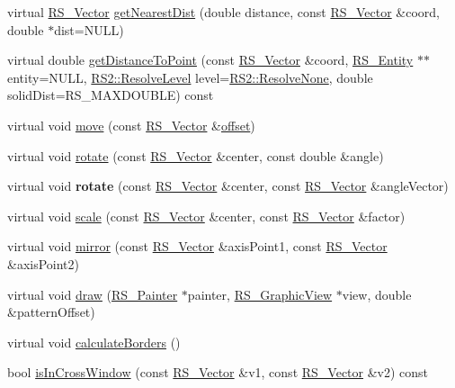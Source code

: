 \begin{DoxyCompactItemize}
\item 
virtual \hyperlink{classRS__Vector}{R\-S\-\_\-\-Vector} \hyperlink{classRS__Solid_adbb51a885514e11fddcdb5795182747e}{get\-Nearest\-Dist} (double distance, const \hyperlink{classRS__Vector}{R\-S\-\_\-\-Vector} \&coord, double $\ast$dist=N\-U\-L\-L)
\item 
virtual double \hyperlink{classRS__Solid_ae2daf279e99bc7f85219e7e456929b9e}{get\-Distance\-To\-Point} (const \hyperlink{classRS__Vector}{R\-S\-\_\-\-Vector} \&coord, \hyperlink{classRS__Entity}{R\-S\-\_\-\-Entity} $\ast$$\ast$entity=N\-U\-L\-L, \hyperlink{classRS2_a1b2c5e3a3e9d1b03a9564229255faa20}{R\-S2\-::\-Resolve\-Level} level=\hyperlink{classRS2_a1b2c5e3a3e9d1b03a9564229255faa20aecb7396f39bc313ad8903c8a5fac5a50}{R\-S2\-::\-Resolve\-None}, double solid\-Dist=R\-S\-\_\-\-M\-A\-X\-D\-O\-U\-B\-L\-E) const 
\item 
virtual void \hyperlink{classRS__Solid_aed6101447eeabe32778563f9ca139a87}{move} (const \hyperlink{classRS__Vector}{R\-S\-\_\-\-Vector} \&\hyperlink{classRS__AtomicEntity_ab708a0d05c11fd7eff646243db60464a}{offset})
\item 
virtual void \hyperlink{classRS__Solid_a4ae083e69808b08ee754c532dff5fa0c}{rotate} (const \hyperlink{classRS__Vector}{R\-S\-\_\-\-Vector} \&center, const double \&angle)
\item 
\hypertarget{classRS__Solid_a706de6d5fb59bc0378154744db448327}{virtual void {\bfseries rotate} (const \hyperlink{classRS__Vector}{R\-S\-\_\-\-Vector} \&center, const \hyperlink{classRS__Vector}{R\-S\-\_\-\-Vector} \&angle\-Vector)}\label{classRS__Solid_a706de6d5fb59bc0378154744db448327}

\item 
virtual void \hyperlink{classRS__Solid_a40a09d59698418b68ea658024053d1ba}{scale} (const \hyperlink{classRS__Vector}{R\-S\-\_\-\-Vector} \&center, const \hyperlink{classRS__Vector}{R\-S\-\_\-\-Vector} \&factor)
\item 
virtual void \hyperlink{classRS__Solid_a589cfb94b97678b58727efabcd6ae7fc}{mirror} (const \hyperlink{classRS__Vector}{R\-S\-\_\-\-Vector} \&axis\-Point1, const \hyperlink{classRS__Vector}{R\-S\-\_\-\-Vector} \&axis\-Point2)
\item 
virtual void \hyperlink{classRS__Solid_a1817d22b8d2d3ebf1178e555ad6381f9}{draw} (\hyperlink{classRS__Painter}{R\-S\-\_\-\-Painter} $\ast$painter, \hyperlink{classRS__GraphicView}{R\-S\-\_\-\-Graphic\-View} $\ast$view, double \&pattern\-Offset)
\item 
virtual void \hyperlink{classRS__Solid_a2d624e7ddc418f5dc382f36095df91bd}{calculate\-Borders} ()
\item 
bool \hyperlink{classRS__Solid_aa7de50b388d234f7919f4bc17873227d}{is\-In\-Cross\-Window} (const \hyperlink{classRS__Vector}{R\-S\-\_\-\-Vector} \&v1, const \hyperlink{classRS__Vector}{R\-S\-\_\-\-Vector} \&v2) const 
\end{DoxyCompactItemize}
